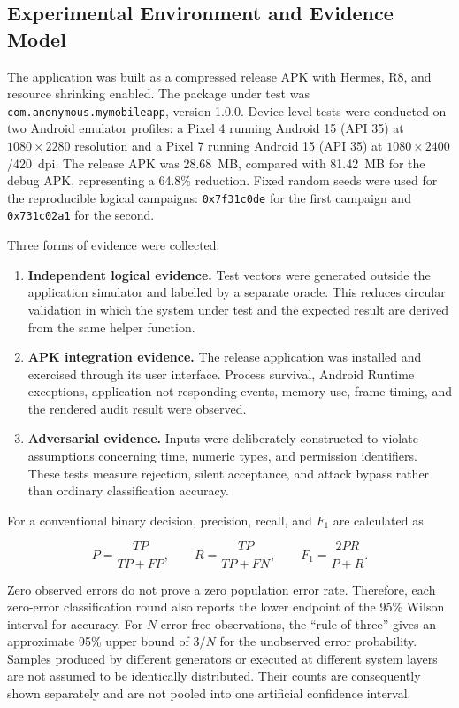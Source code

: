\subsection{Experimental Environment and Evidence Model}

The application was built as a compressed release APK with Hermes, R8, and resource shrinking enabled. The package under test was \texttt{com.anonymous.mymobileapp}, version 1.0.0. Device-level tests were conducted on two Android emulator profiles: a Pixel 4 running Android 15 (API 35) at $1080 \times 2280$ resolution and a Pixel 7 running Android 15 (API 35) at $1080 \times 2400$/420~dpi. The release APK was 28.68~MB, compared with 81.42~MB for the debug APK, representing a 64.8\% reduction. Fixed random seeds were used for the reproducible logical campaigns: \texttt{0x7f31c0de} for the first campaign and \texttt{0x731c02a1} for the second.

Three forms of evidence were collected:

\begin{enumerate}
    \item \textbf{Independent logical evidence.} Test vectors were generated outside the application simulator and labelled by a separate oracle. This reduces circular validation in which the system under test and the expected result are derived from the same helper function.
    \item \textbf{APK integration evidence.} The release application was installed and exercised through its user interface. Process survival, Android Runtime exceptions, application-not-responding events, memory use, frame timing, and the rendered audit result were observed.
    \item \textbf{Adversarial evidence.} Inputs were deliberately constructed to violate assumptions concerning time, numeric types, and permission identifiers. These tests measure rejection, silent acceptance, and attack bypass rather than ordinary classification accuracy.
\end{enumerate}

For a conventional binary decision, precision, recall, and \(F_1\) are calculated as

\begin{equation}
P=\frac{TP}{TP+FP}, \qquad
R=\frac{TP}{TP+FN}, \qquad
F_1=\frac{2PR}{P+R}.
\end{equation}

Zero observed errors do not prove a zero population error rate. Therefore, each zero-error classification round also reports the lower endpoint of the 95\% Wilson interval for accuracy. For \(N\) error-free observations, the ``rule of three'' gives an approximate 95\% upper bound of \(3/N\) for the unobserved error probability. Samples produced by different generators or executed at different system layers are not assumed to be identically distributed. Their counts are consequently shown separately and are not pooled into one artificial confidence interval.

